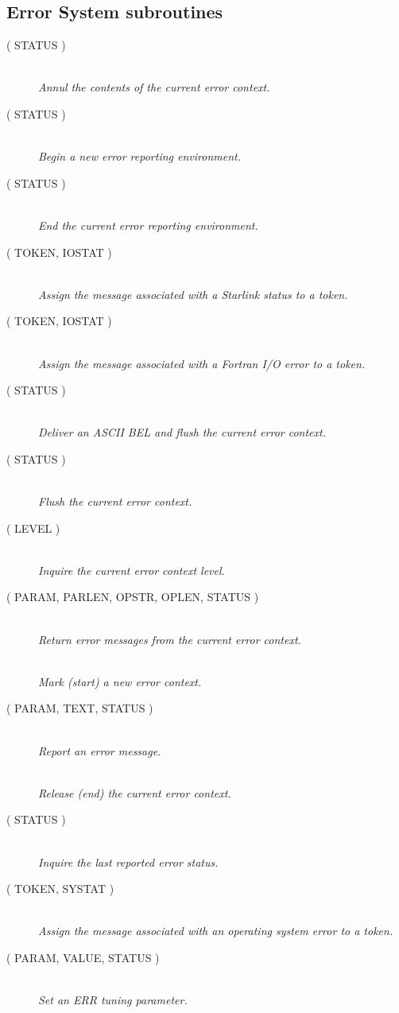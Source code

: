 \documentclass[twoside,11pt]{starlink}
\providecommand{\listline}{\hspace{1pt}\\}
\begin{document}
\subsection{Error System subroutines}
\begin {description}
\item [ ( STATUS )] \listline
\textit{ Annul the contents of the current error context.}
\item [ ( STATUS )] \listline
\textit{ Begin a new error reporting environment.}
\item [ ( STATUS )] \listline
\textit{ End the current error reporting environment.}
\item [ ( TOKEN, IOSTAT )] \listline
\textit{ Assign the message associated with a Starlink status to a
token.}
\item [ ( TOKEN, IOSTAT )] \listline
\textit{ Assign the message associated with a Fortran I/O error to a
token.}
\item [ ( STATUS )] \listline
\textit{ Deliver an ASCII BEL and flush the current error context.}
\item [ ( STATUS )] \listline
\textit{ Flush the current error context.}
\item [ ( LEVEL )] \listline
\textit{ Inquire the current error context level.}
\item [ ( PARAM, PARLEN, OPSTR, OPLEN, STATUS )] \listline
\textit{ Return error messages from the current error context.}
\item [] \listline
\textit{ Mark (start) a new error context.}
\item [ ( PARAM, TEXT, STATUS )] \listline
\textit{ Report an error message.}
\item [] \listline
\textit{ Release (end) the current error context.}
\item [ ( STATUS )] \listline
\textit{ Inquire the last reported error status.}
\item [ ( TOKEN, SYSTAT )] \listline
\textit{ Assign the message associated with an operating system error
to a token.}
\item [ ( PARAM, VALUE, STATUS )] \listline
\textit{ Set an ERR tuning parameter.}
\end {description}
\end{document}
